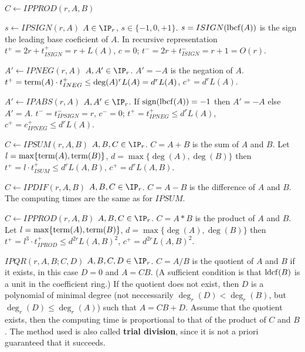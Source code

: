 \begin{deflist}{$C \gets IPPROD(r,A,B)$}
\item[$s \gets IPSIGN(r,A)$] $A \in \IP_r$, $s \in \{-1, 0, +1 \}$. 
     $s = ISIGN({\rm lbcf}(A))$ is the sign the 
     leading base coeficient of $A$.
     In recursive representation 
     $t^+ = 2 r + t^+_{ISIGN} = r + L(A)$, $c = 0$; 
     $t^- = 2 r +t^-_{ISIGN} = r + 1 = O(r)$. 
\item[$A' \gets IPNEG(r,A)$] $A, A' \in \IP_r$. 
     $A' = - A$ is the negation of $A$.
     $t^+ = {\rm term}(A) \cdot t^+_{INEG} 
            \leq \deg(A)^r L(A) = d^r L(A)$, 
     $c^+ = d^r L(A)$. 
\item[$A' \gets IPABS(r,A)$] $A, A' \in \IP_r$. 
     If ${\rm sign}( {\rm lbcf} ( A ) ) = -1$ then $A' = - A$ 
     else $A' = A$.
     $t^- = t^-_{IPSIGN} = r$, $c^- = 0$; 
     $t^+ = t^+_{IPNEG} \leq d^r L(A)$, 
     $c^+ = c^+_{IPNEG} \leq d^r L(A)$. 
\item[$C \gets IPSUM(r,A,B)$] $A, B, C \in \IP_r$.
     $C = A + B$ is the sum of $A$ and $B$. 
     Let $l = \max \{ {\rm term}(A), {\rm term}(B) \}$,
         $d = \max \{ \deg(A), \deg(B) \}$ then 
     $t^+ = l \cdot t^+_{ISUM} \leq d^r L(A,B)$, 
     $c^+ = d^r L(A,B)$. 
\item[$C \gets IPDIF(r,A,B)$] $A, B, C \in \IP_r$.
     $C = A - B$ is the difference of $A$ and $B$. 
     The computing times are the same as for $IPSUM$.
\item[$C \gets IPPROD(r,A,B)$] $A, B, C \in \IP_r$.
     $C = A * B$ is the product of $A$ and $B$. 
     Let $l = \max \{ {\rm term}(A), {\rm term}(B) \}$,
         $d = \max \{ \deg(A), \deg(B) \}$ then 
     $t^+ = l^3 \cdot t^+_{IPROD} \leq d^{2r} L(A,B)^2$, 
     $c^+ = d^{2r} L(A,B)^2$. 
\item[$IPQR(r,A,B; C,D)$] $A, B, C, D \in \IP_r$.
     $C = A / B$ is the quotient of $A$ and $B$ if it exists, 
     in this case $D = 0$ and $A = C B$. 
     (A sufficient condition is that ${\rm ldcf}(B)$ is a unit 
     in the coefficient ring.)
     If the quotient does not exist, then $D$ is a polynomial of 
     minimal degree (not neccessarily $\deg_r(D) < \deg_r(B)$, 
     but $\deg_r(D) \leq \deg_r(A)$) such that $A = C B + D$.
     Assume that the quotient exists, then  
     the computing time is proportional to that of 
     the product of $C$ and $B$. 
     The method used is also called {\bf trial division}, since 
     it is not a priori guaranteed that it succeeds.  

\end{deflist}
